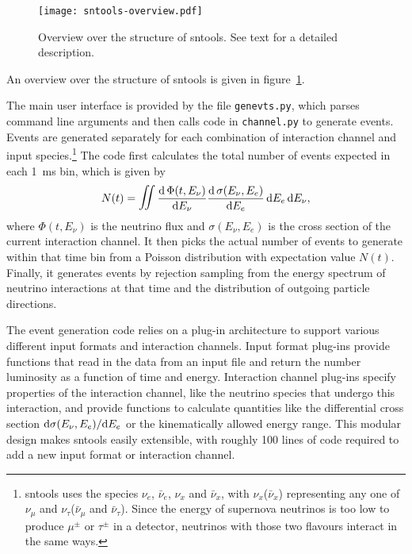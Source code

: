 \documentclass[11pt, oneside]{article}
\renewcommand{\d}{\mathrm{d}}
\newcommand{\tdiff}[3][\empty]{\ifx\empty#1
		\frac{\d\,#2}{\d #3}
	\else
		\frac{\d^{#1}\,#2}{\d #3^{#1}}
	\fi} %
\newcommand{\tdiffx}[3][\empty]{\ifx\empty#1
		\d #2 / \d #3
	\else
		\d^{#1} #2 / \d #3^{#1}
	\fi} %
\newcommand{\nue}{\ensuremath{\nu_e}\xspace}
\newcommand{\numu}{\ensuremath{\nu_\mu}\xspace}
\newcommand{\nutau}{\ensuremath{\nu_\tau}\xspace}
\newcommand{\nux}{\ensuremath{\nu_x}\xspace}
\newcommand{\nuebar}{\ensuremath{\bar{\nu}_e}\xspace}
\newcommand{\numubar}{\ensuremath{\bar{\nu}_\mu}\xspace}
\newcommand{\nutaubar}{\ensuremath{\bar{\nu}_\tau}\xspace}
\newcommand{\nuxbar}{\ensuremath{\bar{\nu}_x}\xspace}
\begin{document}
\begin{figure}[htbp]
	\centering
	\texttt{[image: sntools-overview.pdf]}
	\caption[Overview over the structure of sntools]{Overview over the structure of sntools. See text for a detailed description.}
	\label{fig-sim-sntools-overview}
\end{figure}

An overview over the structure of sntools is given in figure~\ref{fig-sim-sntools-overview}.

The main user interface is provided by the file \texttt{genevts.py}, which parses command line arguments and then calls code in \texttt{channel.py} to generate events.
Events are generated separately for each combination of interaction channel and input species.\footnote{sntools uses the species \nue, \nuebar, \nux and \nuxbar, with \nux (\nuxbar) representing any one of \numu and \nutau (\numubar and \nutaubar). Since the energy of supernova neutrinos is too low to produce $\mu^\pm$ or $\tau^\pm$ in a detector, neutrinos with those two flavours interact in the same ways.}
The code first calculates the total number of events expected in each \SI{1}{ms} bin, which is given by
\begin{equation}
N(t) = \mathop{\mathlarger{\mathlarger{\iint}}} \tdiff{\Phi (t, E_\nu)}{E_\nu} \tdiff{\sigma (E_\nu, E_e)}{E_e}\, \d E_e\,\d E_\nu,
\end{equation}
where $\Phi (t, E_\nu)$ is the neutrino flux and $\sigma (E_\nu, E_e)$ is the cross section of the current interaction channel.
It then picks the actual number of events to generate within that time bin from a Poisson distribution with expectation value $N(t)$.
Finally, it generates events by rejection sampling from the energy spectrum of neutrino interactions at that time and the distribution of outgoing particle directions.

The event generation code relies on a plug-in architecture to support various different input formats and interaction channels.
Input format plug-ins provide functions that read in the data from an input file and return the number luminosity as a function of time and energy.
Interaction channel plug-ins specify properties of the interaction channel, like the neutrino species that undergo this interaction, and provide functions to calculate quantities like the differential cross section $\tdiffx{\sigma (E_\nu, E_e)}{E_e}$ or the kinematically allowed energy range.
This modular design makes sntools easily extensible, with roughly 100 lines of code required to add a new input format or interaction channel.
\end{document}
